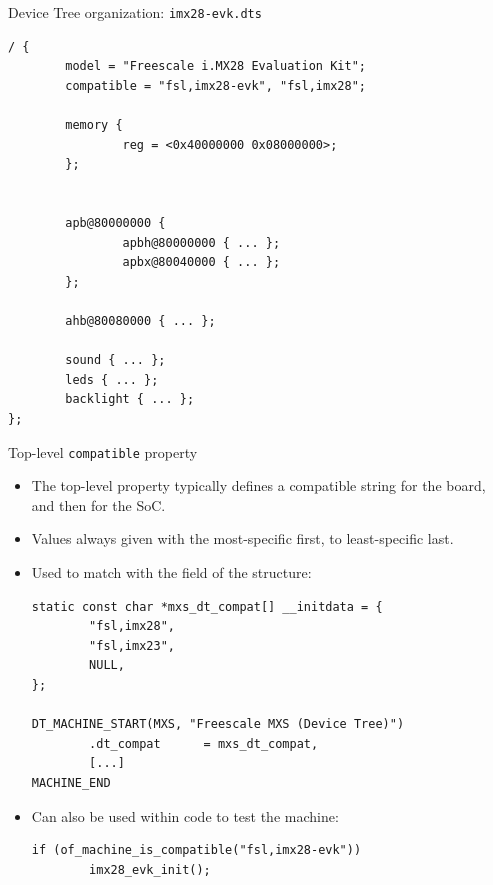 \documentclass[obeyspaces,spaces,hyphens]{beamer}
\begin{document}
\begin{frame}[fragile]{Device Tree organization: {\tt imx28-evk.dts}}
  \begin{block}{}
  \begin{verbatim}
/ {
        model = "Freescale i.MX28 Evaluation Kit";
        compatible = "fsl,imx28-evk", "fsl,imx28";

        memory {
                reg = <0x40000000 0x08000000>;
        };


        apb@80000000 {
                apbh@80000000 { ... };
                apbx@80040000 { ... };
        };

        ahb@80080000 { ... };

        sound { ... };
        leds { ... };
        backlight { ... };
};
\end{verbatim}
\end{block}
\end{frame}

\begin{frame}[fragile]{Top-level {\tt compatible} property}
  \begin{itemize}
  \item The top-level  property typically defines a
    compatible string for the board, and then for the SoC.
  \item Values always given with the most-specific first, to
    least-specific last.
  \item Used to match with the  field of the
     structure:
    \begin{block}{}
      \begin{verbatim}
static const char *mxs_dt_compat[] __initdata = {
        "fsl,imx28",
        "fsl,imx23",
        NULL,
};

DT_MACHINE_START(MXS, "Freescale MXS (Device Tree)")
        .dt_compat      = mxs_dt_compat,
        [...]
MACHINE_END
      \end{verbatim}
    \end{block}
  \item Can also be used within code to test the machine:
    \begin{block}{}
      \begin{verbatim}
if (of_machine_is_compatible("fsl,imx28-evk"))
        imx28_evk_init();
      \end{verbatim}
    \end{block}
  \end{itemize}
\end{frame}
\end{document}
